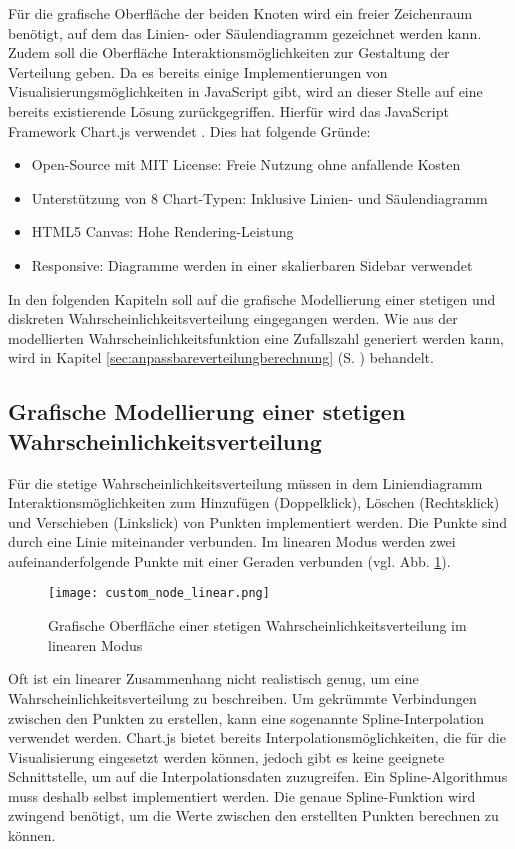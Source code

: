 Für die grafische Oberfläche der beiden Knoten wird ein freier Zeichenraum benötigt, auf dem das Linien- oder Säulendiagramm gezeichnet werden kann. Zudem soll die Oberfläche Interaktionsmöglichkeiten zur Gestaltung der Verteilung geben. Da es bereits einige Implementierungen von Visualisierungsmöglichkeiten in JavaScript gibt, wird an dieser Stelle auf eine bereits existierende Lösung zurückgegriffen. Hierfür wird das JavaScript Framework Chart.js verwendet \cite{chartjs}. Dies hat folgende Gründe:
\begin{itemize}
    \item Open-Source mit MIT License: Freie Nutzung ohne anfallende Kosten
    \item Unterstützung von 8 Chart-Typen: Inklusive Linien- und Säulendiagramm
    \item HTML5 Canvas: Hohe Rendering-Leistung
    \item Responsive: Diagramme werden in einer skalierbaren Sidebar verwendet
\end{itemize}

In den folgenden Kapiteln soll auf die grafische Modellierung einer stetigen und diskreten Wahrscheinlichkeitsverteilung eingegangen werden. Wie aus der modellierten Wahrscheinlichkeitsfunktion eine Zufallszahl generiert werden kann, wird in Kapitel \ref{sec:anpassbareverteilungberechnung} (S. \pageref{sec:anpassbareverteilungberechnung}) behandelt.

\subsection{Grafische Modellierung einer stetigen Wahrscheinlichkeitsverteilung}

Für die stetige Wahrscheinlichkeitsverteilung müssen in dem Liniendiagramm Interaktionsmöglichkeiten zum Hinzufügen (Doppelklick), Löschen (Rechtsklick) und Verschieben (Linkslick) von Punkten implementiert werden. Die Punkte sind durch eine Linie miteinander verbunden. Im linearen Modus werden zwei aufeinanderfolgende Punkte mit einer Geraden verbunden (vgl. Abb. \ref{fig:customnodelinear}).

\begin{figure}[H]
    \centering
    \texttt{[image: custom\_node\_linear.png]}
    \caption{Grafische Oberfläche einer stetigen Wahrscheinlichkeitsverteilung im linearen Modus}
    \label{fig:customnodelinear}
\end{figure}

Oft ist ein linearer Zusammenhang nicht realistisch genug, um eine Wahrscheinlichkeitsverteilung zu beschreiben. Um gekrümmte Verbindungen zwischen den Punkten zu erstellen, kann eine sogenannte Spline-Interpolation verwendet werden. Chart.js bietet bereits Interpolationsmöglichkeiten, die für die Visualisierung eingesetzt werden können, jedoch gibt es keine geeignete Schnittstelle, um auf die Interpolationsdaten zuzugreifen. Ein Spline-Algorithmus muss deshalb selbst implementiert werden. Die genaue Spline-Funktion wird zwingend benötigt, um die Werte zwischen den erstellten Punkten berechnen zu können.

